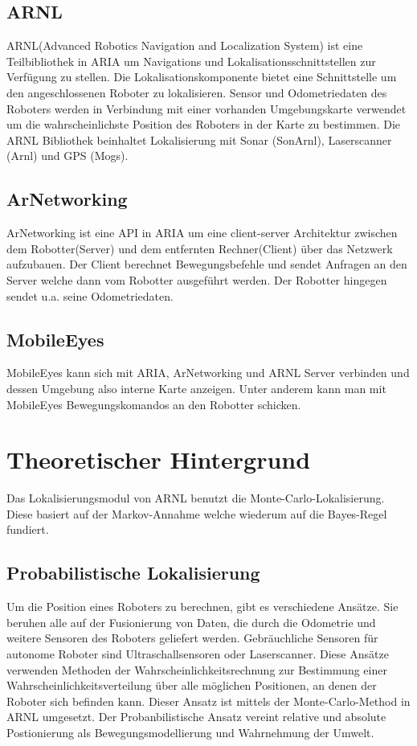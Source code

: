\documentclass{article}
\begin{document}
\subsection{ARNL}
ARNL(Advanced Robotics Navigation and Localization System) ist eine Teilbibliothek in ARIA um Navigations und Lokalisationsschnittstellen zur Verf\"ugung zu stellen. Die Lokalisationskomponente bietet eine Schnittstelle um den angeschlossenen Roboter zu lokalisieren. Sensor und Odometriedaten des Roboters werden in Verbindung mit einer vorhanden Umgebungskarte verwendet um die wahrscheinlichste Position des Roboters in der Karte zu bestimmen. \cite{arnl} 
Die ARNL Bibliothek beinhaltet Lokalisierung mit Sonar (SonArnl), Laserscanner (Arnl) und GPS (Mogs).

\subsection{ArNetworking}


ArNetworking ist eine API in ARIA um eine client-server Architektur zwischen dem Robotter(Server) und dem entfernten Rechner(Client) \"uber das Netzwerk aufzubauen. Der Client berechnet Bewegungsbefehle und sendet Anfragen an den Server welche dann vom Robotter ausgef\"uhrt werden. Der Robotter hingegen sendet u.a. seine Odometriedaten. 


\subsection{MobileEyes}
MobileEyes kann sich mit ARIA, ArNetworking und ARNL Server verbinden und dessen Umgebung also interne Karte anzeigen.
Unter anderem kann man mit MobileEyes Bewegungskomandos an den Robotter schicken.\cite{whitebrook1}








\section{Theoretischer Hintergrund}
Das Lokalisierungsmodul von ARNL benutzt die Monte-Carlo-Lokalisierung. Diese basiert auf der Markov-Annahme welche wiederum auf die Bayes-Regel fundiert.




\subsection{Probabilistische Lokalisierung}
Um die Position eines Roboters zu berechnen, gibt es verschiedene Ans\"atze. Sie beruhen alle auf der Fusionierung von Daten, die durch die Odometrie und weitere Sensoren des Roboters geliefert werden. Gebr\"auchliche Sensoren f\"ur autonome Roboter sind Ultraschallsensoren oder Laserscanner.
Diese Ans\"atze verwenden Methoden der Wahrscheinlichkeitsrechnung zur Bestimmung einer Wahrscheinlichkeitsverteilung \"uber alle m\"oglichen Positionen, an denen der Roboter sich befinden kann. Dieser Ansatz ist mittels der Monte-Carlo-Method in ARNL umgesetzt.
Der Probanbilistische Ansatz vereint relative und absolute Postionierung als Bewegungsmodellierung und Wahrnehmung der Umwelt.
\end{document}
